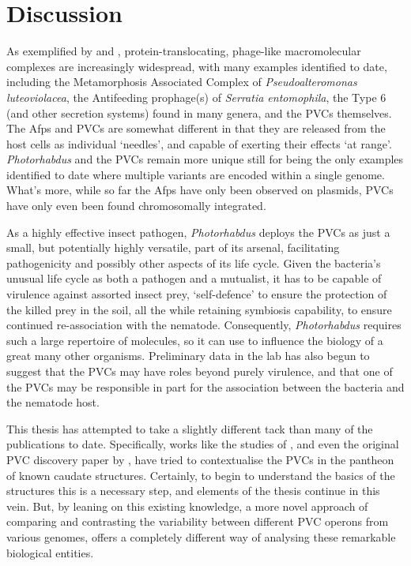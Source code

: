\chapter{Discussion}\label{Discussion}
\pagestyle{IHA-fancy-style}

As exemplified by \cite{Sarris2014} and \cite{Hurst2004}, protein-translocating, phage-like macromolecular complexes are increasingly widespread, with many examples identified to date, including the Metamorphosis Associated Complex of \emph{Pseudoalteromonas luteoviolacea}, the Antifeeding prophage(s) of \emph{Serratia entomophila}, the Type 6 (and other secretion systems) found in many genera, and the PVCs themselves. The Afps and PVCs are somewhat different in that they are released from the host cells as individual `needles', and capable of exerting their effects `at range'. \emph{Photorhabdus} and the PVCs remain more unique still for being the only examples identified to date where multiple variants are encoded within a single genome. What's more, while so far the Afps have only been observed on plasmids, PVCs have only even been found chromosomally integrated.

As a highly effective insect pathogen, \emph{Photorhabdus} deploys the PVCs as just a small, but potentially highly versatile, part of its arsenal, facilitating pathogenicity and possibly other aspects of its life cycle. Given the bacteria's unusual life cycle as both a pathogen and a mutualist, it has to be capable of virulence against assorted insect prey, `self-defence' to ensure the protection of the killed prey in the soil, all the while retaining symbiosis capability, to ensure continued re-association with the nematode. Consequently, \emph{Photorhabdus} requires such a large repertoire of molecules, so it can use to influence the biology of a great many other organisms. Preliminary data in the lab has also begun to suggest that the PVCs may have roles beyond purely virulence, and that one of the PVCs may be responsible in part for the association between the bacteria and the nematode host.

This thesis has attempted to take a slightly different tack than many of the publications to date. Specifically, works like the studies of \cite{Sarris2014}, and even the original PVC discovery paper by \cite{Yang2006}, have tried to contextualise the PVCs in the pantheon of known caudate structures. Certainly, to begin to understand the basics of the structures this is a necessary step, and elements of the thesis continue in this vein. But, by leaning on this existing knowledge, a more novel approach of comparing and contrasting the variability between different PVC operons from various genomes, offers a completely different way of analysing these remarkable biological entities.

